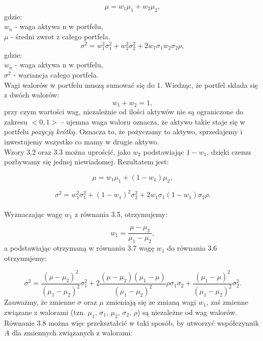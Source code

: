 \documentclass[magister]{dyplom}
\begin{document}
\begin{equation}
	\mu = w_1\mu_1 + w_2\mu_2,
\end{equation}
gdzie:\\
$w_n$ - waga aktywa n w portfelu,\\
$\mu$ - średni zwrot z całego portfela.\\
\begin{equation}
	\sigma^2 = w_1^{2}\sigma_1^{2} + w_2^{2}\sigma_2^{2} + 2w_1\sigma_1w_2\sigma_2\rho, 
\end{equation}
gdzie:\\
$w_n$ - waga aktywa n w portfelu,\\
$\sigma^2$ - wariancja całego portfela.\\
Wagi walorów w portfelu muszą sumować się do 1. Wiedząc, że portfel składa się z dwóch walorów:
\begin{equation}
	w_1 + w_2 = 1,
\end{equation}
przy czym wartości wag, niezależnie od ilości aktywów nie są ograniczone do zakresu $<0,1>$ - ujemna waga waloru oznacza, że aktywo takie staje się w portfelu \textit{pozycją krótką}. Oznacza to, że pożyczamy to aktywo, sprzedajemy i inwestujemy wszystko co mamy w drugie aktywo.\\
Wzory 3.2 oraz 3.3 można uprościć, jako $w_2$ podstawiając $1 - w_1$, dzięki czemu pozbywamy się jednej niewiadomej. Rezultatem jest:

\begin{equation}
	\mu = w_1\mu_1 + (1 - w_1)\mu_2 ,
\end{equation}

\begin{equation}
	\sigma^2 = w_1^{2}\sigma_1^{2} + (1 - w_1)^{2}\sigma_2^{2} + 2w_1\sigma_1(1 - w_1)\sigma_2\rho.
\end{equation}
\\
Wyznaczając wagę $w_1$ z równania 3.5, otrzymujemy:

\begin{equation}
	w_1 = \frac{\mu - \mu_2}{\mu_1 - \mu_2},
\end{equation}
a podstawiając otrzymaną w równaniu 3.7 wagę $w_1$ do równania 3.6 otrzymujemy:

\begin{equation}
	\sigma^2 = \frac{(\mu - \mu_2)^2}{(\mu_1 - \mu_2)^2}\sigma_1^{2} + 2\frac{(\mu - \mu_2)(\mu_1 - \mu)}{(\mu_1 - \mu_2)^2}\rho\sigma_1\sigma_2 + \frac{(\mu_1 - \mu)^2}{(\mu_1 - \mu_2)^2}\sigma_2^{2}.
\end{equation}
Zauważmy, że zmienne $\sigma$ oraz $\mu$ zmieniają się ze zmianą wagi $w_1$, zaś zmienne związane z walorami (tzn. $\mu_1$, $\sigma_1$, $\mu_2$, $\sigma_2$, $\rho$) są niezależne od wag walorów. Równanie 3.8 można więc przekształcić w taki sposób, by utworzyć współczynnik $A$ dla zmiennych związanych z walorami:
\end{document}
